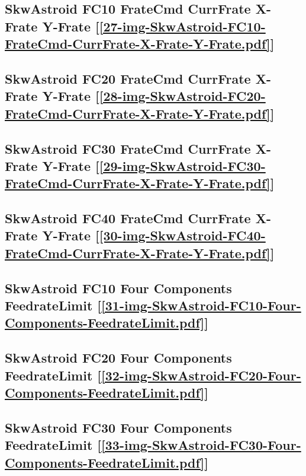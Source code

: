 \subsection       {SkwAstroid FC10 FrateCmd CurrFrate X-Frate Y-Frate
	[\ref      {27-img-SkwAstroid-FC10-FrateCmd-CurrFrate-X-Frate-Y-Frate.pdf}] }
\label{ssec-27-img-SkwAstroid-FC10-FrateCmd-CurrFrate-X-Frate-Y-Frate.pdf}

\subsection       {SkwAstroid FC20 FrateCmd CurrFrate X-Frate Y-Frate
	[\ref      {28-img-SkwAstroid-FC20-FrateCmd-CurrFrate-X-Frate-Y-Frate.pdf}] }
\label{ssec-28-img-SkwAstroid-FC20-FrateCmd-CurrFrate-X-Frate-Y-Frate.pdf}

\subsection       {SkwAstroid FC30 FrateCmd CurrFrate X-Frate Y-Frate
	[\ref      {29-img-SkwAstroid-FC30-FrateCmd-CurrFrate-X-Frate-Y-Frate.pdf}] }
\label{ssec-29-img-SkwAstroid-FC30-FrateCmd-CurrFrate-X-Frate-Y-Frate.pdf}

\subsection       {SkwAstroid FC40 FrateCmd CurrFrate X-Frate Y-Frate
	[\ref      {30-img-SkwAstroid-FC40-FrateCmd-CurrFrate-X-Frate-Y-Frate.pdf}] }
\label{ssec-30-img-SkwAstroid-FC40-FrateCmd-CurrFrate-X-Frate-Y-Frate.pdf}

\subsection       {SkwAstroid FC10 Four Components FeedrateLimit
	[\ref      {31-img-SkwAstroid-FC10-Four-Components-FeedrateLimit.pdf}] }
\label{ssec-31-img-SkwAstroid-FC10-Four-Components-FeedrateLimit.pdf}

\subsection       {SkwAstroid FC20 Four Components FeedrateLimit
	[\ref      {32-img-SkwAstroid-FC20-Four-Components-FeedrateLimit.pdf}] }
\label{ssec-32-img-SkwAstroid-FC20-Four-Components-FeedrateLimit.pdf}

\subsection       {SkwAstroid FC30 Four Components FeedrateLimit
	[\ref      {33-img-SkwAstroid-FC30-Four-Components-FeedrateLimit.pdf}] }
\label{ssec-33-img-SkwAstroid-FC30-Four-Components-FeedrateLimit.pdf}

